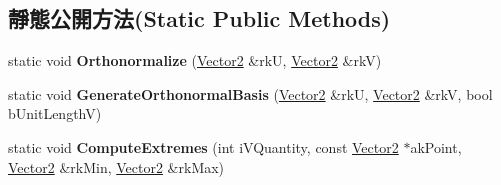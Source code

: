 \subsection*{靜態公開方法(Static Public Methods)}
\begin{DoxyCompactItemize}
\item 
static void {\bfseries Orthonormalize} (\hyperlink{class_i_dream_sky_1_1_vector2}{Vector2} \&rkU, \hyperlink{class_i_dream_sky_1_1_vector2}{Vector2} \&rkV)\hypertarget{class_i_dream_sky_1_1_vector2_a9f06cbe514e4df1c4c14b3abebc8c6aa}{}\label{class_i_dream_sky_1_1_vector2_a9f06cbe514e4df1c4c14b3abebc8c6aa}

\item 
static void {\bfseries Generate\+Orthonormal\+Basis} (\hyperlink{class_i_dream_sky_1_1_vector2}{Vector2} \&rkU, \hyperlink{class_i_dream_sky_1_1_vector2}{Vector2} \&rkV, bool b\+Unit\+LengthV)\hypertarget{class_i_dream_sky_1_1_vector2_a8b7a7689c9df4f32c1f201be1ced15c3}{}\label{class_i_dream_sky_1_1_vector2_a8b7a7689c9df4f32c1f201be1ced15c3}

\item 
static void {\bfseries Compute\+Extremes} (int i\+V\+Quantity, const \hyperlink{class_i_dream_sky_1_1_vector2}{Vector2} $\ast$ak\+Point, \hyperlink{class_i_dream_sky_1_1_vector2}{Vector2} \&rk\+Min, \hyperlink{class_i_dream_sky_1_1_vector2}{Vector2} \&rk\+Max)\hypertarget{class_i_dream_sky_1_1_vector2_a3698b90ff411d61dc089861c95633b8a}{}\label{class_i_dream_sky_1_1_vector2_a3698b90ff411d61dc089861c95633b8a}

\end{DoxyCompactItemize}
